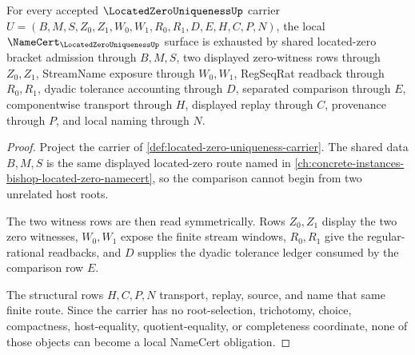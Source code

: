 \begin{theorem}
\label{thm:located-zero-uniqueness-obligations}
For every accepted $\LocatedZeroUniquenessUp$ carrier $U=(B,M,S,Z_0,Z_1,W_0,W_1,R_0,R_1,D,E,H,C,P,N)$, the local $\NameCert_{\LocatedZeroUniquenessUp}$ surface is exhausted by shared located-zero bracket admission through $B,M,S$, two displayed zero-witness rows through $Z_0,Z_1$, StreamName exposure through $W_0,W_1$, RegSeqRat readback through $R_0,R_1$, dyadic tolerance accounting through $D$, separated comparison through $E$, componentwise transport through $H$, displayed replay through $C$, provenance through $P$, and local naming through $N$.
\end{theorem}
\begin{proof}
Project the carrier of \autoref{def:located-zero-uniqueness-carrier}. The shared data $B,M,S$ is the same displayed located-zero route named in \autoref{ch:concrete-instances-bishop-located-zero-namecert}, so the comparison cannot begin from two unrelated host roots.

The two witness rows are then read symmetrically. Rows $Z_0,Z_1$ display the two zero witnesses, $W_0,W_1$ expose the finite stream windows, $R_0,R_1$ give the regular-rational readbacks, and $D$ supplies the dyadic tolerance ledger consumed by the comparison row $E$.

The structural rows $H,C,P,N$ transport, replay, source, and name that same finite route. Since the carrier has no root-selection, trichotomy, choice, compactness, host-equality, quotient-equality, or completeness coordinate, none of those objects can become a local NameCert obligation.
\end{proof}

